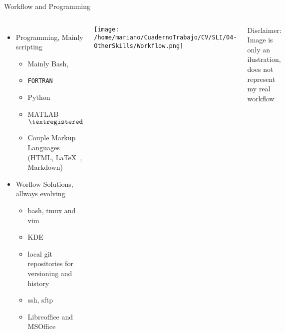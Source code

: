 \begin{frame}{Workflow and Programming}

  \begin{columns}
    \begin{itemize}
    \small
      \item Programming, Mainly scripting
	\begin{itemize}
    \small
	  \item Mainly Bash,
	  \item \texttt{FORTRAN}
	  \item Python
	  \item MATLAB$\textregistered$ 
	  \item Couple Markup Languages (HTML, \LaTeX\ , Markdown)
	\end{itemize}
	\item Worflow Solutions, allways evolving
	  \begin{itemize}
    \small
	    \item bash, tmux and vim
	    \item KDE
	    \item local git repositories for versioning and history
	    \item ssh, sftp 
	    \item Libreoffice and MSOffice
	  \end{itemize}
  \end{itemize}
    \texttt{[image: /home/mariano/CuadernoTrabajo/CV/SLI/04-OtherSkills/Workflow.png]}

\tiny
Disclaimer:  Image is only an ilustration, does not represent my real workflow
  \end{columns}

\end{frame}
